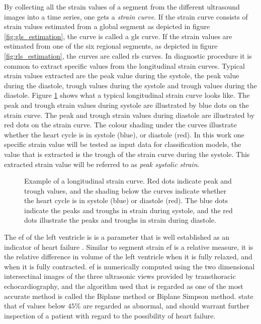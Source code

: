 By collecting all the strain values of a segment from the different ultrasound images into a time series, one gets a \textit{strain curve}. If the strain curve consists of strain values estimated from a global segment as depicted in figure \ref{fig:gls_estimation}, the curve is called a \acrfull{gls} curve. If the strain values are estimated from one of the six regional segments, as depicted in figure \ref{fig:rls_estimation}, the curves are called \acrfull{rls} curves. In diagnostic procedure it is common to extract specific values from the longitudinal strain curves. Typical strain values extracted are the peak value during the systole, the peak value during the diastole, trough values during the systole and trough values during the diastole. Figure \ref{fig:pss_illustration} shows what a typical longitudinal strain curve looks like. The peak and trough strain values during systole are illustrated by blue dots on the strain curve. The peak and trough strain values during diastole are illustrated by red dots on the strain curve. The colour shading under the curves illustrate whether the heart cycle is in systole (blue), or diastole (red). In this work one specific strain value will be tested as input data for classification models, the value that is extracted is the trough of the strain curve during the systole. This extracted strain value will be referred to as \textit{peak systolic strain}.

\begin{figure}[H]
    \centering
    
    \caption{Example of a longitudinal strain curve. Red dots indicate peak and trough values, and the shading below the curves indicate whether the heart cycle is in systole (blue) or diastole (red). The blue dots indicate the peaks and troughs in strain during systole, and the red dots illustrate the peaks and troughs in strain during diastole.}
    \label{fig:pss_illustration}
\end{figure}

The \acrfull{ef} of the left ventricle is is a parameter that is well established as an indicator of heart failure \cite{myocardial_imaging}. Similar to segment strain \acrshort{ef} is a relative measure, it is the relative difference in volume of the left ventricle when it is fully relaxed, and when it is fully contracted. \acrshort{ef} is numerically computed using the two dimensional intersectinal images of the three ultrasonic views provided by transthoracic echocardiography, and the algorithm used that is regarded as one of the most accurate method is called the Biplane method \cite{myocardial_imaging} or Biplane Simpson method.
\cite{myocardial_defomation_analysis} \textcite{myocardial_imaging} state that \acrshort{ef} values below $45\%$ are regarded as abnormal, and should warrant further inspection of a patient with regard to the possibility of heart failure.

